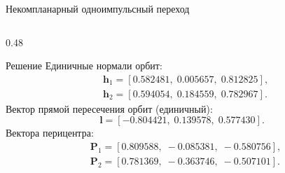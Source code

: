 \documentclass[9pt]{beamer}
\begin{document}
\begin{frame}{Некомпланарный одноимпульсный переход}
\begin{columns}[T,totalwidth=\textwidth]
  \begin{column}{0.48\textwidth}
    \begin{exampleblock}{Решение}
        Единичные нормали орбит:
        \begin{align*}
            &\mathbf{h}_1 = [0.582481, \; 0.005657, \; 0.812825], \\
            &\mathbf{h}_2 = [0.594054, \; 0.184559, \; 0.782967].
        \end{align*}
        Вектор прямой пересечения орбит (единичный):
        \begin{equation*}
            \mathbf{l} = [-0.804421, \; 0.139578, \; 0.577430].
        \end{equation*}
        Вектора перицентра:
        \begin{align*}
            &\mathbf{P}_1 = [0.809588, \; -0.085381, \; -0.580756], \\
            &\mathbf{P}_2 = [0.781369, \; -0.363746, \; -0.507101].
        \end{align*}
    \end{exampleblock}
  \end{column}
\end{columns}
\end{frame}
\end{document}
